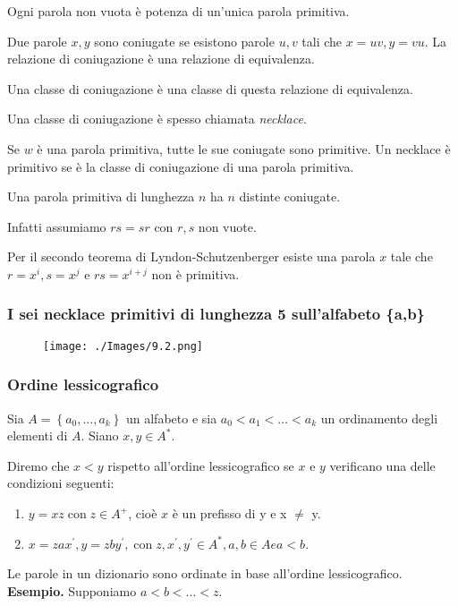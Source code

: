 Ogni parola non vuota è potenza di un'unica parola primitiva.

\vspace{5mm}

Due parole $x, y$ sono coniugate se esistono parole $u, v$ tali che $x=u v, y=v u .$ La relazione di coniugazione è una relazione di equivalenza.

Una classe di coniugazione è una classe di questa relazione di equivalenza.

Una classe di coniugazione è spesso chiamata \textit{necklace}.

\vspace{5mm}

Se $w$ è una parola primitiva, tutte le sue coniugate sono primitive. 
Un necklace è primitivo se è la classe di coniugazione di una parola primitiva.

\vspace{5mm}

Una parola primitiva di lunghezza $n$ ha $n$ distinte coniugate.

Infatti assumiamo $r s=s r$ con $r, s$ non vuote.

Per il secondo teorema di Lyndon-Schutzenberger esiste una parola $x$ tale che $r=x^{i}, s=x^{j}$ e $r s=x^{i+j}$ non è primitiva.

\subsubsection{I sei necklace primitivi di lunghezza 5 sull'alfabeto \{a,b\}}

\begin{figure}[hbpt!]
    \centering
    \texttt{[image: ./Images/9.2.png]}
\end{figure}
\FloatBarrier

\subsubsection{Ordine lessicografico}

Sia $A=\left\{a_{0}, \ldots, a_{k}\right\}$ un alfabeto e sia $a_{0}<a_{1}<\ldots<a_{k}$ un ordinamento degli elementi di $A$. Siano $x, y \in A^{*}$.

Diremo che $x<y$ rispetto all'ordine lessicografico se $x$ e $y$ verificano una delle condizioni seguenti:
\begin{enumerate}
    \item $y=x z \operatorname{con} z \in A^{+}$, cioè $x$ è un prefisso di y e x $\neq$ y.
    \item $x=z a x^{\prime}, y=z b y^{\prime}, \operatorname{con} z, x^{\prime}, y^{\prime} \in A^{*}, a, b \in A e a<b$.
\end{enumerate}
Le parole in un dizionario sono ordinate in base all'ordine lessicografico.
\textbf{Esempio.} Supponiamo $a<b<\ldots<z$.

